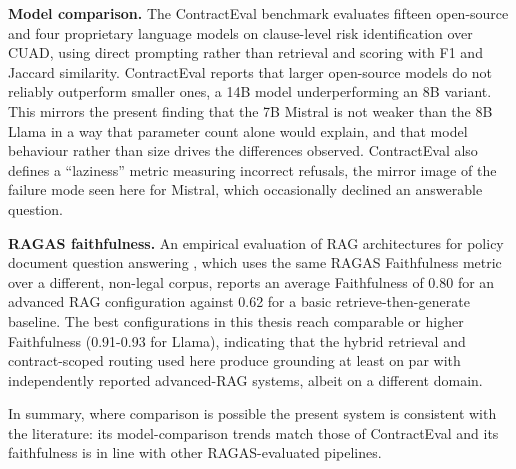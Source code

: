 \textbf{Model comparison.} The ContractEval benchmark \cite{contracteval2025} evaluates fifteen open-source and four proprietary language models on clause-level risk identification over CUAD, using direct prompting rather than retrieval and scoring with F1 and Jaccard similarity. ContractEval reports that larger open-source models do not reliably outperform smaller ones, a 14B model underperforming an 8B variant. This mirrors the present finding that the 7B Mistral is not weaker than the 8B Llama in a way that parameter count alone would explain, and that model behaviour rather than size drives the differences observed. ContractEval also defines a ``laziness'' metric measuring incorrect refusals, the mirror image of the failure mode seen here for Mistral, which occasionally declined an answerable question.


\textbf{RAGAS faithfulness.} An empirical evaluation of RAG architectures for policy document question answering \cite{policyrag2026}, which uses the same RAGAS Faithfulness metric over a different, non-legal corpus, reports an average Faithfulness of 0.80 for an advanced RAG configuration against 0.62 for a basic retrieve-then-generate baseline. The best configurations in this thesis reach comparable or higher Faithfulness (0.91-0.93 for Llama), indicating that the hybrid retrieval and contract-scoped routing used here produce grounding at least on par with independently reported advanced-RAG systems, albeit on a different domain.

In summary, where comparison is possible the present system is consistent with the
literature: its model-comparison trends match those of ContractEval and its faithfulness is in line with other RAGAS-evaluated pipelines.

